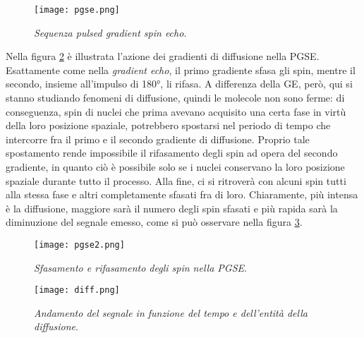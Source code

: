 \documentclass{report}
\newcommand{\figref}[1]{figura \ref{#1}}
\numberwithin{equation}{section}
\numberwithin{figure}{section}
\begin{document}
\begin{figure}[htp]
\centering
\texttt{[image: pgse.png]}
\caption{\label{fig:pgse} \textit{Sequenza pulsed gradient spin echo}.}
\end{figure}

\noindent Nella \figref{fig:pgse2} è illustrata l'azione dei gradienti di diffusione nella PGSE. Esattamente come nella \textit{gradient echo}, il primo gradiente sfasa gli spin, mentre il secondo, insieme all'impulso di 180°, li rifasa. A differenza della GE, però, qui si stanno studiando fenomeni di diffusione, quindi le molecole non sono ferme: di conseguenza, spin di nuclei che prima avevano acquisito una certa fase in virtù della loro posizione spaziale, potrebbero spostarsi nel periodo di tempo che intercorre fra il primo e il secondo gradiente di diffusione. Proprio tale spostamento rende impossibile il rifasamento degli spin ad opera del secondo gradiente, in quanto ciò è possibile solo se i nuclei conservano la loro posizione spaziale durante tutto il processo. Alla fine, ci si ritroverà con alcuni spin tutti alla stessa fase e altri completamente sfasati fra di loro. Chiaramente, più intensa è la diffusione, maggiore sarà il numero degli spin sfasati e più rapida sarà la diminuzione del segnale emesso, come si può osservare nella \figref{fig:diff}.

\begin{figure}[htp]
\centering
\texttt{[image: pgse2.png]}
\caption{\label{fig:pgse2} \textit{Sfasamento e rifasamento degli spin nella PGSE}.}
\end{figure}

\begin{figure}[htp]
\centering
\texttt{[image: diff.png]}
\caption{\label{fig:diff} \textit{Andamento del segnale in funzione del tempo e dell'entità della diffusione}.}
\end{figure}
\end{document}
